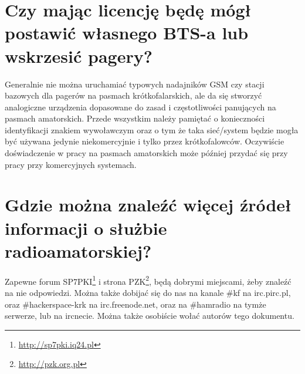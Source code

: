 \documentclass[a4paper,12pt]{article}
\begin{document}
\section{Czy mając licencję będę mógł postawić własnego BTS-a lub wskrzesić pagery?}
Generalnie nie można uruchamiać typowych nadajników GSM czy stacji bazowych dla pagerów na pasmach krótkofalarskich, ale da się stworzyć analogiczne urządzenia dopasowane do zasad i częstotliwości panujących na pasmach amatorskich. Przede wszystkim należy pamiętać o konieczności identyfikacji znakiem wywoławczym oraz o tym że taka sieć/system będzie mogła być używana jedynie niekomercyjnie i tylko przez krótkofalowców. Oczywiście doświadczenie w pracy na pasmach amatorskich może później przydać się przy pracy przy komercyjnych systemach.

\section{Gdzie można znaleźć więcej źródeł informacji o służbie radioamatorskiej?}
Zapewne forum SP7PKI\footnote{\url{http://sp7pki.iq24.pl}} i strona PZK\footnote{\url{http://pzk.org.pl}}, będą dobrymi miejscami, żeby znaleźć na nie odpowiedzi. Można także dobijać się do nas na kanale \#kf na irc.pirc.pl, oraz \#hackerspace-krk na irc.freenode.net, oraz na \#hamradio na tymże serwerze, lub na ircnecie. Można także osobiście wołać autorów tego dokumentu.
\end{document}
